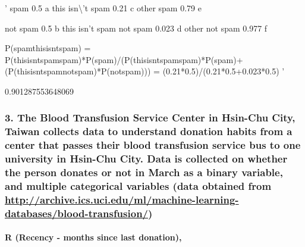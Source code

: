 \documentclass[11pt]{article}
\begin{document}
    '
spam 0.5 a
this isn\textbackslash{}'t spam 0.21 c
other spam 0.79 e

not spam 0.5 b
this isn't spam not spam 0.023 d
other not spam 0.977 f

P(spam\textbar{}thisisntspam) = P(thisisntspam\textbar{}spam)*P(spam)/(P(thisisntspam\textbar{}spam)*P(spam)+(P(thisisntspam\textbar{}notspam)*P(notspam)))
                    = (0.21*0.5)/(0.21*0.5+0.023*0.5)
'

    
    0.901287553648069

    
    \hypertarget{the-blood-transfusion-service-center-in-hsin-chu-city-taiwan-collects-data-to-understand-donation-habits-from-a-center-that-passes-their-blood-transfusion-service-bus-to-one-university-in-hsin-chu-city.-data-is-collected-on-whether-the-person-donates-or-not-in-march-as-a-binary-variable-and-multiple-categorical-variables-data-obtained-from-httparchive.ics.uci.edumlmachine-learning-databasesblood-transfusion}{%
\subsubsection{\texorpdfstring{3. The Blood Transfusion Service Center
in Hsin-Chu City, Taiwan collects data to understand donation habits
from a center that passes their blood transfusion service bus to one
university in Hsin-Chu City. Data is collected on whether the person
donates or not in March as a binary variable, and multiple categorical
variables (data obtained from
\url{http://archive.ics.uci.edu/ml/machine-learning-databases/blood-transfusion/})}{3. The Blood Transfusion Service Center in Hsin-Chu City, Taiwan collects data to understand donation habits from a center that passes their blood transfusion service bus to one university in Hsin-Chu City. Data is collected on whether the person donates or not in March as a binary variable, and multiple categorical variables (data obtained from http://archive.ics.uci.edu/ml/machine-learning-databases/blood-transfusion/)}}\label{the-blood-transfusion-service-center-in-hsin-chu-city-taiwan-collects-data-to-understand-donation-habits-from-a-center-that-passes-their-blood-transfusion-service-bus-to-one-university-in-hsin-chu-city.-data-is-collected-on-whether-the-person-donates-or-not-in-march-as-a-binary-variable-and-multiple-categorical-variables-data-obtained-from-httparchive.ics.uci.edumlmachine-learning-databasesblood-transfusion}}

\hypertarget{r-recency---months-since-last-donation}{%
\paragraph{R (Recency - months since last
donation),}\label{r-recency---months-since-last-donation}}
\end{document}
